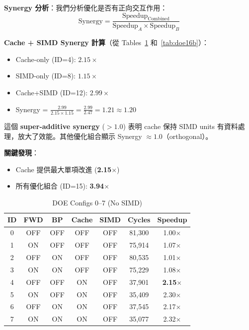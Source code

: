 \documentclass[journal]{IEEEtran}
\begin{document}
\textbf{Synergy 分析}：我們分析優化是否有正向交互作用：
\begin{equation}
\text{Synergy} = \frac{\text{Speedup}_{\text{Combined}}}{\text{Speedup}_A \times \text{Speedup}_B}
\end{equation}

\textbf{Cache + SIMD Synergy 計算}（從 Tables~\ref{tab:doe16a} 和~\ref{tab:doe16b}）：
\begin{itemize}
    \item Cache-only (ID=4): $2.15\times$
    \item SIMD-only (ID=8): $1.15\times$
    \item Cache+SIMD (ID=12): $2.99\times$
    \item Synergy = $\frac{2.99}{2.15 \times 1.15} = \frac{2.99}{2.47} = \mathbf{1.21 \approx 1.20}$
\end{itemize}

這個 \textbf{super-additive synergy} ($>1.0$) 表明 cache 保持 SIMD units 有資料處理，放大了效能。其他優化組合顯示 Synergy $\approx 1.0$（orthogonal）。

\textbf{關鍵發現}：
\begin{itemize}
    \item Cache 提供最大單項改進 (\textbf{2.15$\times$})
    \item 所有優化組合 (ID=15): \textbf{3.94$\times$}
\end{itemize}

\begin{table}[!tbp]
\centering
\caption{DOE Configs 0--7 (No SIMD)}
\label{tab:doe16a}
\footnotesize
\setlength{\tabcolsep}{3pt}
\begin{tabular}{@{}ccccccc@{}}
\toprule
\textbf{ID} & \textbf{FWD} & \textbf{BP} & \textbf{Cache} & \textbf{SIMD} & \textbf{Cycles} & \textbf{Speedup} \\
\midrule
0 & OFF & OFF & OFF & OFF & 81,300 & 1.00$\times$ \\
1 & ON & OFF & OFF & OFF & 75,914 & 1.07$\times$ \\
2 & OFF & ON & OFF & OFF & 80,535 & 1.01$\times$ \\
3 & ON & ON & OFF & OFF & 75,229 & 1.08$\times$ \\
4 & OFF & OFF & ON & OFF & 37,901 & \textbf{2.15$\times$} \\
5 & ON & OFF & ON & OFF & 35,409 & 2.30$\times$ \\
6 & OFF & ON & ON & OFF & 37,545 & 2.17$\times$ \\
7 & ON & ON & ON & OFF & 35,077 & 2.32$\times$ \\
\bottomrule
\end{tabular}
\end{table}
\end{document}
